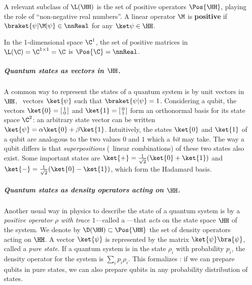 A relevant subclass of $\L(\HH)$ is the set of positive operators $\Pos{\HH}$, playing the role of ``non‑negative real numbers''.
A linear operator $\M$ is \textbf{positive} %
if $\braket{\psi | \M | \psi} \in \nnReal$ for any $\ket \psi \in \HH$.

\begin{remark}
\label{rem:pos}
In the 1-dimensional space $\C^1$, the set of positive matrices in $\L(\C)=\C^{1\times 1}=\C$ is $\Pos{\C}=\nnReal$.
\end{remark}

\subparagraph{Quantum states as vectors in $\HH$.}

A common way to represent the states of a quantum system is by unit vectors in $\HH$, \ie\ vectors $\ket{\psi}$ such that $\braket{\psi | \psi} = 1$.
Considering a qubit, the vectors $\ket{0} = \left[\begin{smallmatrix}1\\0\end{smallmatrix}\right]$ and $\ket{1} = \left[\begin{smallmatrix}0\\1\end{smallmatrix}\right]$ form an orthonormal basis for its state space $\C^2$: an arbitrary state vector can be written $\ket{\psi} = \alpha \ket{0} + \beta \ket{1}$.
Intuitively, the states $\ket{0}$ and $\ket{1}$ of a qubit are analogous to the two values $0$ and $1$ which a \emph{bit} may take.
The way a qubit differs is that \emph{superpositions} (\ie\ linear combinations) of these two states also exist.
Some important states are $\ket{+} = \frac{1}{\sqrt{2}}(\ket{0} + \ket{1})$ and $\ket{-} = \frac{1}{\sqrt{2}}(\ket{0} - \ket{1})$, which form the Hadamard basis.

\subparagraph{Quantum states as density operators acting on $\HH$.}

Another usual way in physics to describe the state of a quantum system is by a \emph{positive operator $\rho$ with trace $1$}---called a ---that \emph{acts} on the state space $\HH$ of the system.
We denote by $\D(\HH) \subset \Pos{\HH}$ the set of density operators acting on $\HH$.
A vector $\ket{\psi}$ is represented by the matrix $\ket{\psi}\bra{\psi}$, called a \emph{pure state}.
If a quantum system is in the state $\rho_{i}$ with probability $p_i$, the density operator for the system is $\sum_{i} p_{i} \rho_{i}$.
This formalizes : if we can prepare qubits in pure states, we can also prepare qubits in any probability distribution of states.

